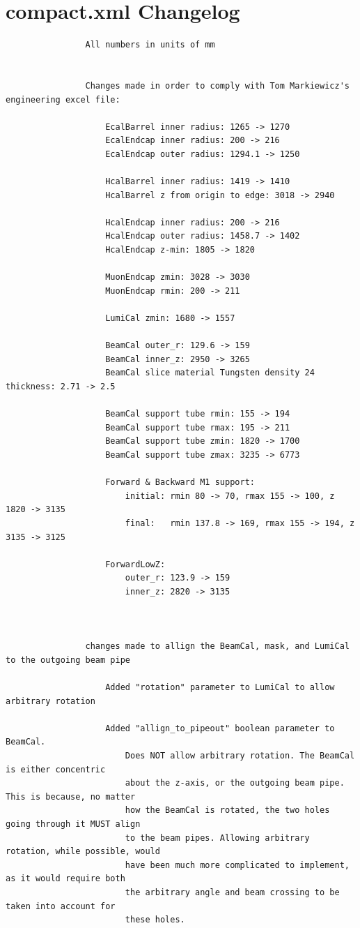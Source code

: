 \documentclass{report}
\begin{document}
        \section{compact.xml Changelog} \label{sect__compact_changes}
            \begin{verbatim}
                All numbers in units of mm


                Changes made in order to comply with Tom Markiewicz's engineering excel file:

                    EcalBarrel inner radius: 1265 -> 1270
                    EcalEndcap inner radius: 200 -> 216
                    EcalEndcap outer radius: 1294.1 -> 1250

                    HcalBarrel inner radius: 1419 -> 1410
                    HcalBarrel z from origin to edge: 3018 -> 2940

                    HcalEndcap inner radius: 200 -> 216
                    HcalEndcap outer radius: 1458.7 -> 1402
                    HcalEndcap z-min: 1805 -> 1820

                    MuonEndcap zmin: 3028 -> 3030
                    MuonEndcap rmin: 200 -> 211

                    LumiCal zmin: 1680 -> 1557

                    BeamCal outer_r: 129.6 -> 159
                    BeamCal inner_z: 2950 -> 3265
                    BeamCal slice material Tungsten density 24 thickness: 2.71 -> 2.5
                    
                    BeamCal support tube rmin: 155 -> 194
                    BeamCal support tube rmax: 195 -> 211
                    BeamCal support tube zmin: 1820 -> 1700
                    BeamCal support tube zmax: 3235 -> 6773

                    Forward & Backward M1 support:
                        initial: rmin 80 -> 70, rmax 155 -> 100, z 1820 -> 3135
                        final:   rmin 137.8 -> 169, rmax 155 -> 194, z 3135 -> 3125

                    ForwardLowZ:
                        outer_r: 123.9 -> 159
                        inner_z: 2820 -> 3135



                changes made to allign the BeamCal, mask, and LumiCal to the outgoing beam pipe

                    Added "rotation" parameter to LumiCal to allow arbitrary rotation

                    Added "allign_to_pipeout" boolean parameter to BeamCal. 
                        Does NOT allow arbitrary rotation. The BeamCal is either concentric 
                        about the z-axis, or the outgoing beam pipe. This is because, no matter
                        how the BeamCal is rotated, the two holes going through it MUST align 
                        to the beam pipes. Allowing arbitrary rotation, while possible, would
                        have been much more complicated to implement, as it would require both
                        the arbitrary angle and beam crossing to be taken into account for 
                        these holes.


\end{verbatim}
\end{document}
